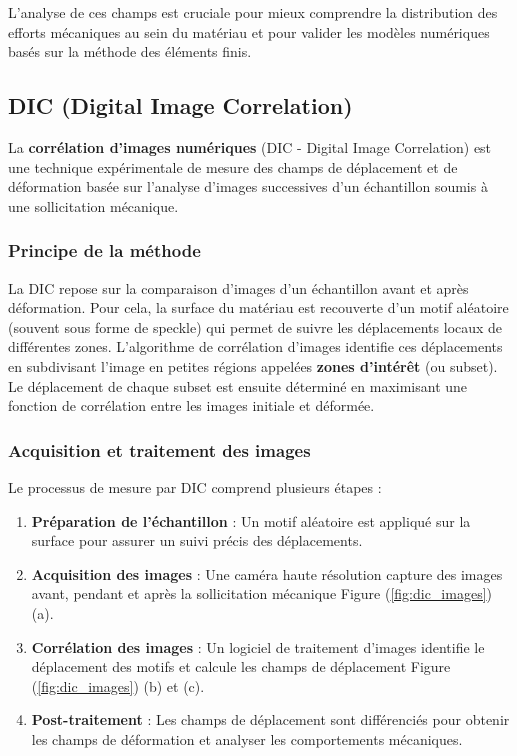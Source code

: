 \documentclass[12pt,a4paper]{article}
\begin{document}
L’analyse de ces champs est cruciale pour mieux comprendre la distribution des efforts mécaniques au sein du matériau et pour valider les modèles numériques basés sur la méthode des éléments finis.



\subsection{DIC (Digital Image Correlation)}
La \textbf{corrélation d’images numériques} (DIC - Digital Image Correlation) est une technique expérimentale de mesure des champs de déplacement et de déformation basée sur l’analyse d’images successives d’un échantillon soumis à une sollicitation mécanique.

\subsubsection{Principe de la méthode}
La DIC repose sur la comparaison d’images d’un échantillon avant et après déformation. Pour cela, la surface du matériau est recouverte d’un motif aléatoire (souvent sous forme de speckle) qui permet de suivre les déplacements locaux de différentes zones. L’algorithme de corrélation d’images identifie ces déplacements en subdivisant l’image en petites régions appelées \textbf{zones d’intérêt} (ou subset). Le déplacement de chaque subset est ensuite déterminé en maximisant une fonction de corrélation entre les images initiale et déformée.

\subsubsection{Acquisition et traitement des images}
Le processus de mesure par DIC comprend plusieurs étapes :
\begin{enumerate}
    \item \textbf{Préparation de l’échantillon} : Un motif aléatoire est appliqué sur la surface pour assurer un suivi précis des déplacements.
    \item \textbf{Acquisition des images} : Une caméra haute résolution capture des images avant, pendant et après la sollicitation mécanique Figure (\ref{fig:dic_images}) (a).
    \item \textbf{Corrélation des images} : Un logiciel de traitement d’images identifie le déplacement des motifs et calcule les champs de déplacement Figure (\ref{fig:dic_images}) (b) et (c).
    \item \textbf{Post-traitement} : Les champs de déplacement sont différenciés pour obtenir les champs de déformation et analyser les comportements mécaniques.
\end{enumerate}
\end{document}
